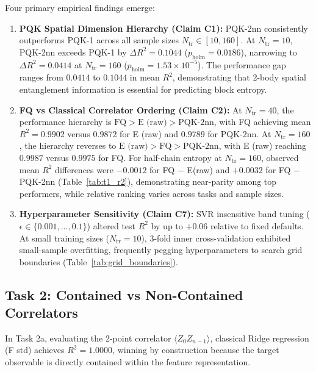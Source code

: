 \documentclass[conference]{IEEEtran}
\begin{document}
Four primary empirical findings emerge:
\begin{enumerate}
    \item \textbf{PQK Spatial Dimension Hierarchy (Claim C1):} PQK-2nn consistently outperforms PQK-1 across all sample sizes $N_{\text{tr}} \in [10, 160]$. At $N_{\text{tr}}=10$, PQK-2nn exceeds PQK-1 by $\Delta R^2 = 0.1044$ ($p_{\text{holm}} = 0.0186$), narrowing to $\Delta R^2 = 0.0414$ at $N_{\text{tr}}=160$ ($p_{\text{holm}} = 1.53 \times 10^{-5}$). The performance gap ranges from $0.0414$ to $0.1044$ in mean $R^2$, demonstrating that 2-body spatial entanglement information is essential for predicting block entropy.
    \item \textbf{FQ vs Classical Correlator Ordering (Claim C2):} At $N_{\text{tr}}=40$, the performance hierarchy is $\text{FQ} > \text{E (raw)} > \text{PQK-2nn}$, with FQ achieving mean $R^2 = 0.9902$ versus $0.9872$ for E (raw) and $0.9789$ for PQK-2nn. At $N_{\text{tr}}=160$, the hierarchy reverses to $\text{E (raw)} > \text{FQ} > \text{PQK-2nn}$, with E (raw) reaching $0.9987$ versus $0.9975$ for FQ. For half-chain entropy at $N_{\mathrm{tr}}=160$, observed mean $R^2$ differences were $-0.0012$ for FQ $-$ E(raw) and $+0.0032$ for FQ $-$ PQK-2nn (Table~\ref{tab:t1_r2}), demonstrating near-parity among top performers, while relative ranking varies across tasks and sample sizes.
    \item \textbf{Hyperparameter Sensitivity (Claim C7):} SVR insensitive band tuning ($\epsilon \in \{0.001, \dots, 0.1\}$) altered test $R^2$ by up to $+0.06$ relative to fixed defaults. At small training sizes ($N_{\text{tr}}=10$), 3-fold inner cross-validation exhibited small-sample overfitting, frequently pegging hyperparameters to search grid boundaries (Table~\ref{tab:grid_boundaries}).
\end{enumerate}

\subsection{Task 2: Contained vs Non-Contained Correlators}
In Task 2a, evaluating the 2-point correlator $\langle Z_0 Z_{n-1} \rangle$, classical Ridge regression (F std) achieves $R^2 = 1.0000$, winning by construction because the target observable is directly contained within the feature representation.
\end{document}
